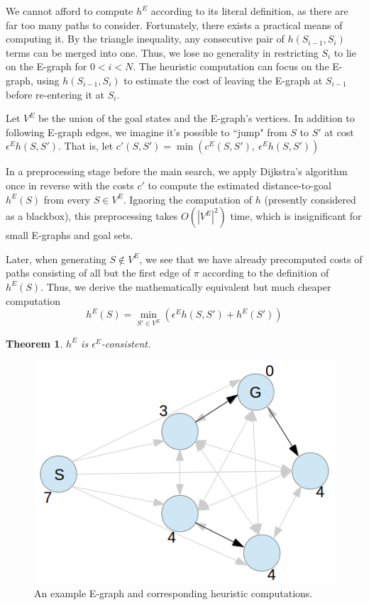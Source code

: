 \documentclass[letterpaper]{article}
\newtheorem{thm}{Theorem}
\begin{document}
We cannot afford to compute $h^E$ according to its literal definition, as there are far too many paths to consider.
Fortunately, there exists a practical means of computing it. By the triangle inequality, any consecutive pair of $h(S_{i-1},S_i)$ terms can be merged into one.
Thus, we lose no generality in restricting $S_i$ to lie on the E-graph for $0 < i < N$.
The heuristic computation can focus on the E-graph, using $h(S_{i-1},S_i)$ to estimate the cost of leaving the E-graph at $S_{i-1}$ before re-entering it at $S_i$.

Let $V^E$ be the union of the goal states and the E-graph's vertices.
In addition to following E-graph edges, we imagine it's possible to ``jump" from $S$ to $S'$ at cost $\epsilon^E h(S,S')$.
That is, let $c'(S,S') = \min\left(c^E(S,S'),~\epsilon^E h(S,S')\right)$


In a preprocessing stage before the main search, we apply Dijkstra's algorithm once in reverse with the costs $c'$ to compute the estimated distance-to-goal $h^E(S)$ from every $S\in V^E$. Ignoring the computation of $h$ (presently considered as a blackbox), this preprocessing takes $O(|V^E|^2)$ time, which is insignificant for small E-graphs and goal sets.

Later, when generating $S \notin V^E$, we see that we have already precomputed costs of paths consisting of all but the first edge of $\pi$ according to the definition of $h^E(S)$. Thus, we derive the mathematically equivalent but much cheaper computation
\[h^E(S) = \min_{S'\in V^E} \left(\epsilon^E h(S,S') + h^E(S')\right)\]

\begin{thm}$h^E$ is $\epsilon^E$-consistent. \cite{phillips2012graphs}\end{thm}

\begin{figure}
	\begin{center}
	\includegraphics[scale=0.5]{Pentagon.png}
	\end{center}
	\caption{An example E-graph and corresponding heuristic computations.}
	\label{fig:example}
\end{figure}
\end{document}
